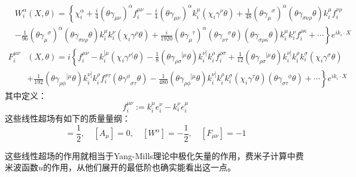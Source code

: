 \begin{equation}
	\label{eq:5.50}
	\begin{aligned}
		&W_i^\alpha (X, \theta) =
		\left\{
		\chi_i^\alpha
		+ \frac{i}{4} (\theta \gamma_{\mu\nu})^\alpha f_i^{\mu\nu}
		- \frac{i}{4} (\theta \gamma_{\mu\nu})^\alpha k_i^\mu (\chi_i \gamma^\nu \theta)+\frac{1}{48}(\theta{\gamma_\mu}^\sigma)^\alpha(\theta\gamma_{\sigma\nu\rho}\theta)k^\mu_i f^{\nu\rho}_i\right.\\
		& \left.- \frac{1}{96} (\theta \gamma_\mu^{\phantom{\mu} \sigma})^\alpha (\theta \gamma_{\sigma\nu\rho} \theta) k_i^\mu k_i^\nu (\chi_i \gamma^\rho \theta)
		+ \frac{i}{1920} (\theta \gamma_\mu^{\phantom{\mu} \tau})^\alpha (\theta \gamma_{\nu\tau}^{\phantom{\nu\tau} \sigma} \theta) (\theta \gamma_{\sigma\rho\kappa} \theta) k_i^\mu k_i^\nu f_i^{\rho\kappa}
		+ \cdots
		\right\} e^{ik_i \cdot X}
	\end{aligned}
\end{equation}
\begin{equation}
	\label{eq:5.51}
	\begin{aligned}
		F_i^{\mu\nu} &(X, \theta) = i
		\left\{
		f_i^{\mu\nu}
		- k_i^{[\mu} (\chi_i \gamma^{\nu]} \theta)
		- \frac{1}{8} (\theta \gamma_{\rho\sigma}^{\phantom{\rho\sigma} [\mu} \theta) k_i^{\nu]} k_i^\rho f_i^{\rho\sigma}
		+ \frac{1}{12} (\theta \gamma_{\rho\sigma}^{\phantom{\rho\sigma} [\mu} \theta) k_i^{\nu]} k_i^\rho k_i^\sigma (\chi_i \gamma^\sigma \theta)\right.\\
		&\left.+\frac{1}{192}(\theta{\gamma_{\rho\phi}}^{[\mu}\theta)k_i^{\nu]}k_i^\rho f_i^{\sigma\tau}(\theta{\gamma^\phi}_{\sigma\tau}\theta)
		- \frac{1}{480} (\theta \gamma_{\rho\phi}^{\phantom{\rho\phi} [\mu} \theta) k_i^{\nu]} k_i^\rho k_i^\sigma(\chi_i\gamma^\tau\theta) (\theta \gamma_{\sigma\tau}^{\phantom{\sigma\tau} \phi} \theta)
		+ \cdots
		\right\} e^{ik_i \cdot X}
	\end{aligned}
\end{equation}
其中定义：
\begin{equation}
	f_i^{\mu\nu}:=k_i^\mu e_i^\nu-k_i^\nu e_i^\mu
\end{equation}
这些线性超场有如下的质量量纲：
\begin{equation}
	[A_\alpha]=\frac{1}{2},\quad[A_\mu]=0,\quad[W^\alpha]=-\frac{1}{2},\quad[F_{\mu\nu}]=-1
\end{equation}

这些线性超场的作用就相当于Yang-Mills理论中极化矢量的作用，费米子计算中费米波函数$u$的作用，从他们展开的最低阶也确实能看出这一点。

